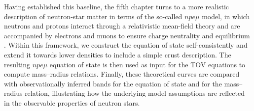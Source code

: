 Having established this baseline, the fifth chapter turns to a more realistic
description of neutron-star matter in terms of the so-called \(npe\mu\) model,
in which neutrons and protons interact through a relativistic mean-field
theory and are accompanied by electrons and muons to ensure charge neutrality
and equilibrium \cite{SerotWalecka1986,glendenning2000}.
Within this framework, we construct the equation of state
self-consistently and extend it towards lower densities to include a simple
crust description. The resulting \(npe\mu\) equation of state is then used as
input for the TOV equations to compute mass--radius relations. Finally, these
theoretical curves are compared with observationally inferred bands for the
equation of state and for the mass--radius relation, illustrating how the
underlying model assumptions are reflected in the observable properties of
neutron stars.
